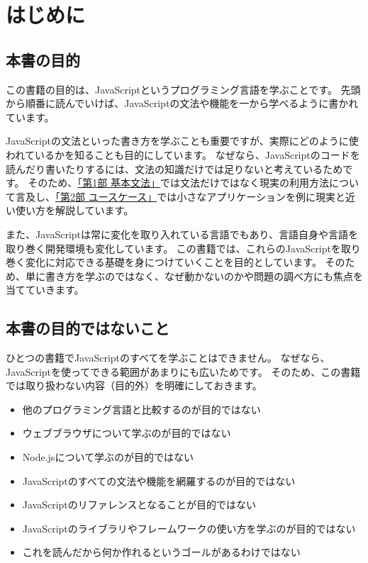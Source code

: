 \hypertarget{prolog}{%
\chapter*{はじめに}\label{prolog}}
\thispagestyle{frontheadings}

\hypertarget{do}{%
\section*{本書の目的}\label{do}}

この書籍の目的は、JavaScriptというプログラミング言語を学ぶことです。
先頭から順番に読んでいけば、JavaScriptの文法や機能を一から学べるように書かれています。

JavaScriptの文法といった書き方を学ぶことも重要ですが、実際にどのように使われているかを知ることも目的にしています。
なぜなら、JavaScriptのコードを読んだり書いたりするには、文法の知識だけでは足りないと考えているためです。
そのため、\hyperlink{basic-grammar}{「第1部 基本文法」}では文法だけではなく現実の利用方法について言及し、\hyperlink{use-case}{「第2部 ユースケース」}では小さなアプリケーションを例に現実と近い使い方を解説しています。

また、JavaScriptは常に変化を取り入れている言語でもあり、言語自身や言語を取り巻く開発環境も変化しています。
この書籍では、これらのJavaScriptを取り巻く変化に対応できる基礎を身につけていくことを目的としています。
そのため、単に書き方を学ぶのではなく、なぜ動かないのかや問題の調べ方にも焦点を当てていきます。

\hypertarget{do-not}{%
\section*{本書の目的ではないこと}\label{do-not}}

ひとつの書籍でJavaScriptのすべてを学ぶことはできません。
なぜなら、JavaScriptを使ってできる範囲があまりにも広いためです。
そのため、この書籍では取り扱わない内容（目的外）を明確にしておきます。

\begin{itemize}
\item
  他のプログラミング言語と比較するのが目的ではない
\item
  ウェブブラウザについて学ぶのが目的ではない
\item
  Node.jsについて学ぶのが目的ではない
\item
  JavaScriptのすべての文法や機能を網羅するのが目的ではない
\item
  JavaScriptのリファレンスとなることが目的ではない
\item
  JavaScriptのライブラリやフレームワークの使い方を学ぶのが目的ではない
\item
  これを読んだから何か作れるというゴールがあるわけではない
\end{itemize}


